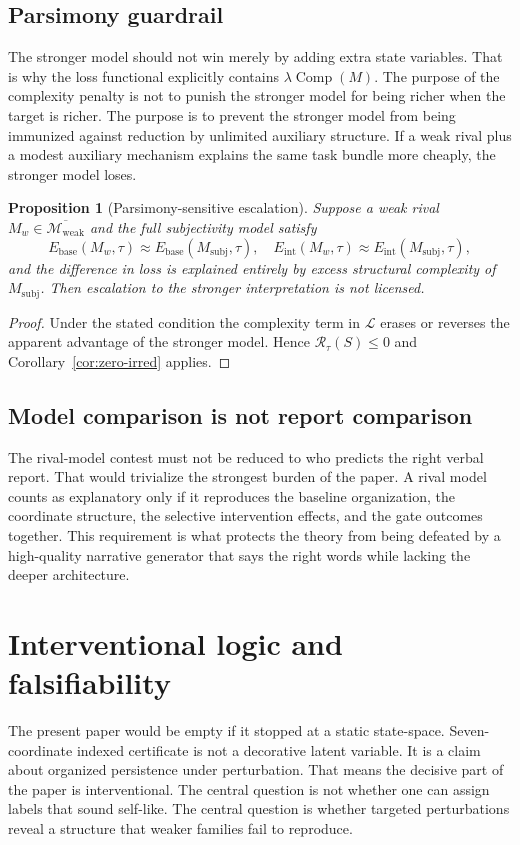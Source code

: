 \documentclass[11pt,a4paper]{article}
\newtheorem{proposition}[theorem]{Proposition}
\theoremstyle{definition}
\newcommand{\WeakFam}{\mathcal{M}_{\mathrm{weak}}}
\newcommand{\WeakClosure}{\overline{\WeakFam}}
\newcommand{\Irred}{\mathcal{R}}
\newcommand{\Loss}{\mathcal{L}}
\newcommand{\Comp}{\operatorname{Comp}}
\begin{document}
\subsection{Parsimony guardrail}
The stronger model should not win merely by adding extra state variables. That is why the loss functional explicitly contains $\lambda\Comp(M)$. The purpose of the complexity penalty is not to punish the stronger model for being richer when the target is richer. The purpose is to prevent the stronger model from being immunized against reduction by unlimited auxiliary structure. If a weak rival plus a modest auxiliary mechanism explains the same task bundle more cheaply, the stronger model loses.

\begin{proposition}[Parsimony-sensitive escalation]
Suppose a weak rival $M_w\in\WeakClosure$ and the full subjectivity model satisfy
\[
E_{\mathrm{base}}(M_w,\tau)\approx E_{\mathrm{base}}(M_{\mathrm{subj}},\tau),\quad
E_{\mathrm{int}}(M_w,\tau)\approx E_{\mathrm{int}}(M_{\mathrm{subj}},\tau),
\]
and the difference in loss is explained entirely by excess structural complexity of $M_{\mathrm{subj}}$. Then escalation to the stronger interpretation is not licensed.
\end{proposition}

\begin{proof}
Under the stated condition the complexity term in $\Loss$ erases or reverses the apparent advantage of the stronger model. Hence $\Irred_\tau(S)\le 0$ and Corollary~\ref{cor:zero-irred} applies.
\end{proof}

\subsection{Model comparison is not report comparison}
The rival-model contest must not be reduced to who predicts the right verbal report. That would trivialize the strongest burden of the paper. A rival model counts as explanatory only if it reproduces the baseline organization, the coordinate structure, the selective intervention effects, and the gate outcomes together. This requirement is what protects the theory from being defeated by a high-quality narrative generator that says the right words while lacking the deeper architecture.

\section{Interventional logic and falsifiability}
The present paper would be empty if it stopped at a static state-space. Seven-coordinate indexed certificate is not a decorative latent variable. It is a claim about organized persistence under perturbation. That means the decisive part of the paper is interventional. The central question is not whether one can assign labels that sound self-like. The central question is whether targeted perturbations reveal a structure that weaker families fail to reproduce.
\end{document}

